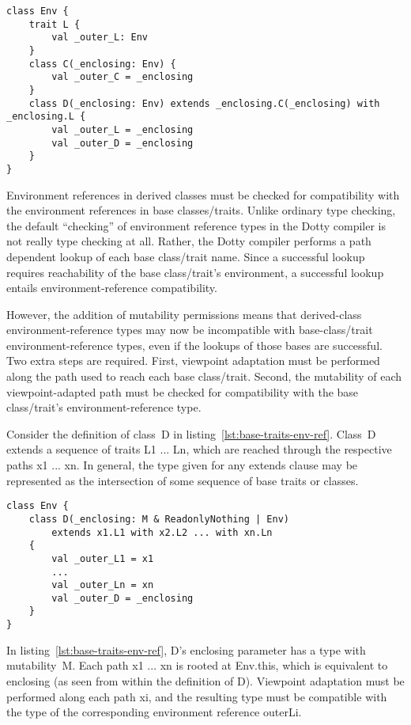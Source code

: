 \begin{lstlisting}[float=htbp, caption={Base Class and Trait with Environment References}, label={lst:base-class-trait-env-ref}]
class Env {
	trait L {
		val _outer_L: Env
	}
	class C(_enclosing: Env) {
		val _outer_C = _enclosing
	}
	class D(_enclosing: Env) extends _enclosing.C(_enclosing) with _enclosing.L {
		val _outer_L = _enclosing
		val _outer_D = _enclosing
	}
}
\end{lstlisting}

Environment references in derived classes must be checked for compatibility with the environment references in base classes/traits. Unlike ordinary type checking, the default ``checking'' of environment reference types in the Dotty compiler is not really type checking at all. Rather, the Dotty compiler performs a path dependent lookup of each base class/trait name. Since a successful lookup requires reachability of the base class/trait's environment, a successful lookup entails environment-reference compatibility.

However, the addition of mutability permissions means that derived-class environment-reference types may now be incompatible with base-class/trait environment-reference types, even if the lookups of those bases are successful. Two extra steps are required. First, viewpoint adaptation must be performed along the path used to reach each base class/trait. Second, the mutability of each viewpoint-adapted path must be checked for compatibility with the base class/trait's environment-reference type.

Consider the definition of class~{\cd D} in listing~\ref{lst:base-traits-env-ref}. Class~{\cd D} extends a sequence of traits {\cd L1} ... {\cd Ln}, which are reached through the respective paths {\cd x1} ... {\cd xn}. In general, the type given for any {\cd extends} clause may be represented as the intersection of some sequence of base traits or classes.

\begin{lstlisting}[float=htbp, caption={Base Traits with Environment References}, label={lst:base-traits-env-ref}]
class Env {
	class D(_enclosing: M & ReadonlyNothing | Env)
		extends x1.L1 with x2.L2 ... with xn.Ln
	{
		val _outer_L1 = x1
		...
		val _outer_Ln = xn
		val _outer_D = _enclosing
	}
}
\end{lstlisting}

In listing~\ref{lst:base-traits-env-ref}, \mbox{{\cd D}'s} {\cd \und enclosing} parameter has a type with mutability~{\cd M}.
Each path {\cd x1} ... {\cd xn} is rooted at {\cd Env.this}, which is equivalent to {\cd \und enclosing} (as seen from within the definition of {\cd D}).
Viewpoint adaptation must be performed along each path {\cd xi}, and the resulting type must be compatible with the type of the corresponding environment reference {\cd\und outer\und Li}.



